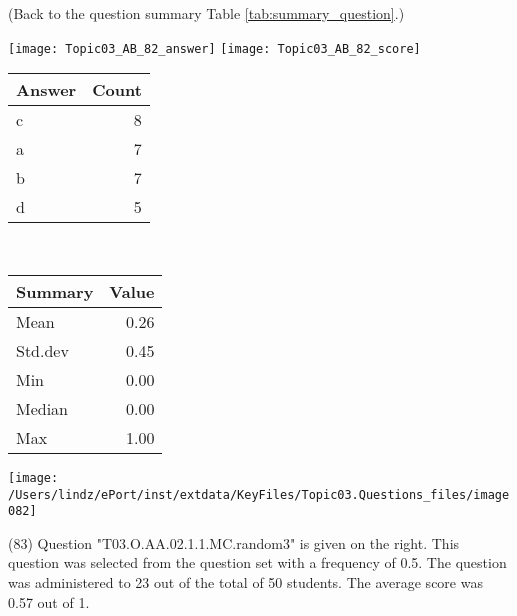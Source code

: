 \documentclass[12pt,english,nohyper]{tufte-handout}\usepackage[]{graphicx}\usepackage[]{color}
\begin{document}
 (Back to the question summary Table \ref{tab:summary_question}.)

\begin{center} \texttt{[image: Topic03\_AB\_82\_answer]} \texttt{[image: Topic03\_AB\_82\_score]} \end{center} 

\begin{center}%
\begin{tabular}{lr}
  \hline
Answer & Count \\ 
  \hline
c &   8 \\ 
  a &   7 \\ 
  b &   7 \\ 
  d &   5 \\ 
   \hline
\end{tabular}
~~~~~~~~%
\begin{tabular}{lr}
  \hline
Summary & Value \\ 
  \hline
Mean & 0.26 \\ 
  Std.dev & 0.45 \\ 
  Min & 0.00 \\ 
  Median & 0.00 \\ 
  Max & 1.00 \\ 
   \hline
\end{tabular}
\end{center}\newpage{}



\vspace{4cm}\begin{marginfigure}\texttt{[image: /Users/lindz/ePort/inst/extdata/KeyFiles/Topic03.Questions\_files/image082]}\end{marginfigure}\vspace{-4cm} (83) Question "T03.O.AA.02.1.1.MC.random3" is given on the right. This question was selected from the question set with a frequency of 0.5. The question was administered to 23 out of the total of 50 students. The average score was 0.57 out of 1.
\end{document}

